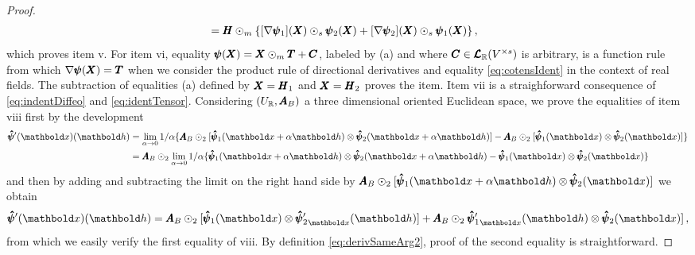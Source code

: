 {\begin{proof}
\begin{align*}
&=\pmb{H}\odot_m\{[\nabla\pmb{\psi}_1](\pmb{X})\odot_s\pmb{\psi}_2(\pmb{X})+[\nabla\pmb{\psi}_2](\pmb{X})\odot_s\pmb{\psi}_1(\pmb{X})\}\,,
\end{align*}
which proves item v. For item vi, equality $\pmb{\psi}(\pmb{X})=\pmb{X}\odot_m\pmb{T}+\pmb{C}$, labeled by (a) and where $\pmb{C}\in\pmb{\mathcal{L}}_{\mathbb{R}}(V^{\times s})$ is arbitrary, is a function rule from which $\nabla\pmb{\psi}(\pmb{X})=\pmb{T}$ when we consider the product rule of directional derivatives and equality \eqref{eq:cotensIdent} in the context of real fields. The subtraction of equalities (a) defined by $\pmb{X}=\pmb{H}_1$ and $\pmb{X}=\pmb{H}_2$ proves the item. Item vii is a straighforward consequence of \eqref{eq:indentDiffeo} and \eqref{eq:identTensor}. Considering $(U_{\mathbb{R}},\pmb{A}_B)$ a three dimensional oriented Euclidean space, we prove the equalities of item viii first by the development
\begin{align*}
\fua{\tnr{\hat\psi}'(\vto{x})}{\vto{h}}&=\lim_{\alpha\to 0}1/\alpha\{\tnr{A}_B\odot_{2}[\fua{\tnr{\hat\psi}_1}{\vto{x}+\alpha\vto{h}}\otimes\fua{\tnr{\hat\psi}_2}{\vto{x}+\alpha\vto{h}}]-\tnr{A}_B\odot_{2}[\fua{\tnr{\hat\psi}_1}{\vto{x}}\otimes\fua{\tnr{\hat\psi}_2}{\vto{x}}]\}\\
&=\tnr{A}_B\odot_{2}\lim_{\alpha\to 0}1/\alpha\{\fua{\tnr{\hat\psi}_1}{\vto{x}+\alpha\vto{h}}\otimes\fua{\tnr{\hat\psi}_2}{\vto{x}+\alpha\vto{h}}-\fua{\tnr{\hat\psi}_1}{\vto{x}}\otimes\fua{\tnr{\hat\psi}_2}{\vto{x}}\}
\end{align*}
and then by adding and subtracting the limit on the right hand side by $\tnr{A}_B\odot_{2}[\fua{\tnr{\hat\psi}_1}{\vto{x}+\alpha\vto{h}}\otimes\fua{\tnr{\hat\psi}_2}{\vto{x}}]$ we obtain
\begin{equation*}
\fua{\tnr{\hat\psi}'(\vto{x})}{\vto{h}}= \tnr{A}_B\odot_{2}[\fua{\tnr{\hat\psi}_1}{\vto{x}}\otimes\fua{{\tnr{\hat\psi}_2'}_{\vto{x}}}{\vto{h}}]+\tnr{A}_B\odot_{2}\fua{{\tnr{\hat\psi}_1'}_{\vto{x}}}{\vto{h}} \otimes \fua{\tnr{\hat\psi}_2}{\vto{x}}]\,,
\end{equation*}
from which we easily verify the first equality of viii. By definition \eqref{eq:derivSameArg2}, proof of the second equality is straightforward. 
\end{proof}}

